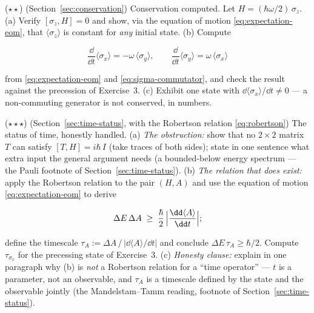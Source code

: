 \begin{problemset}
\item ($\star\star$) (Section~\ref{sec:conservation}) Conservation computed. Let $H = (\hbar\omega/2)\,\sigma_z$. (a) Verify $[\sigma_z,H] = 0$ and show, via the equation of motion \eqref{eq:expectation-eom}, that $\langle\sigma_z\rangle$ is constant for \emph{any} initial state. (b) Compute
\begin{linenomath}
    \begin{equation}
        \frac{\dd}{\dd t}\langle\sigma_x\rangle = -\omega\,\langle\sigma_y\rangle,
        \qquad
        \frac{\dd}{\dd t}\langle\sigma_y\rangle = \omega\,\langle\sigma_x\rangle
    \end{equation}
\end{linenomath}
from \eqref{eq:expectation-eom} and \eqref{eq:sigma-commutator}, and check the result against the precession of Exercise~3. (c) Exhibit one state with $\dd\langle\sigma_x\rangle/\dd t \neq 0$ --- a non-commuting generator is not conserved, in numbers.

\item ($\star\star\star$) (Section~\ref{sec:time-status}, with the Robertson relation \eqref{eq:robertson}) The status of time, honestly handled. (a) \emph{The obstruction:} show that no $2\times2$ matrix $T$ can satisfy $[T,H] = i\hbar\,I$ (take traces of both sides); state in one sentence what extra input the general argument needs (a bounded-below energy spectrum --- the Pauli footnote of Section~\ref{sec:time-status}). (b) \emph{The relation that does exist:} apply the Robertson relation to the pair $(H,A)$ and use the equation of motion \eqref{eq:expectation-eom} to derive
\begin{linenomath}
    \begin{equation}
        \Delta E\,\Delta A \;\geq\; \frac{\hbar}{2}\,\Bigl|\frac{\dd\langle A\rangle}{\dd t}\Bigr| ;
    \end{equation}
\end{linenomath}
define the timescale $\tau_A := \Delta A\,/\,\bigl|\dd\langle A\rangle/\dd t\bigr|$ and conclude $\Delta E\,\tau_A \geq \hbar/2$. Compute $\tau_{\sigma_x}$ for the precessing state of Exercise~3. (c) \emph{Honesty clause:} explain in one paragraph why (b) is \emph{not} a Robertson relation for a ``time operator'' --- $t$ is a parameter, not an observable, and $\tau_A$ is a timescale defined by the state and the observable jointly (the Mandelstam--Tamm reading, footnote of Section~\ref{sec:time-status}).


\end{problemset}
